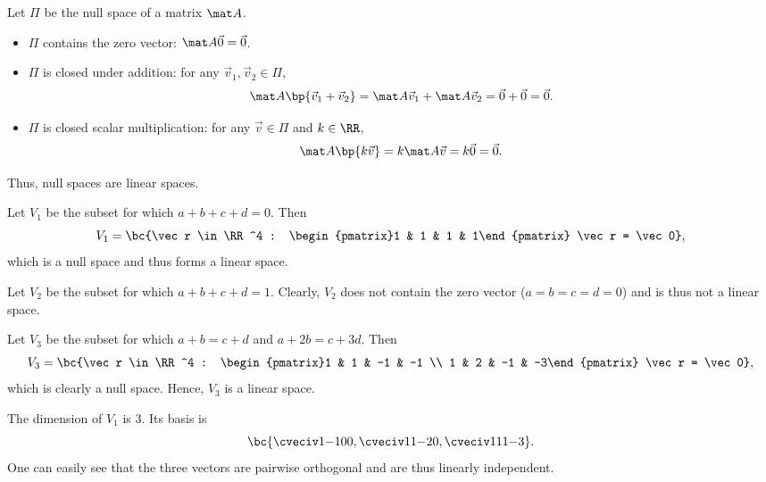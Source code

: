 \begin{solution}
    Let $\Pi$ be the null space of a matrix $\mat A$.
    \begin{itemize}
        \item $\Pi$ contains the zero vector: $\mat A \vec 0 = \vec 0$.
        \item $\Pi$ is closed under addition: for any $\vec v_1, \vec v_2 \in \Pi$, \[\mat A \bp{\vec v_1 + \vec v_2} = \mat A \vec v_1 + \mat A \vec v_2 = \vec 0 + \vec 0 = \vec 0.\]
        \item $\Pi$ is closed scalar multiplication: for any $\vec v \in \Pi$ and $k \in \RR$, \[\mat A \bp{k \vec v} = k \mat A \vec v = k \vec 0 = \vec 0.\]
    \end{itemize}
    Thus, null spaces are linear spaces.
        
    \begin{ppart}
        Let $V_1$ be the subset for which $a + b + c + d = 0$. Then \[V_1 = \bc{\vec r \in \RR^4 : \begin{pmatrix}1 & 1 & 1 & 1\end{pmatrix} \vec r = \vec 0},\] which is a null space and thus forms a linear space.
    \end{ppart}
    \begin{ppart}
        Let $V_2$ be the subset for which $a + b + c + d = 1$. Clearly, $V_2$ does not contain the zero vector ($a = b = c = d = 0$) and is thus not a linear space.
    \end{ppart}
    \begin{ppart}
        Let $V_3$ be the subset for which $a + b = c + d$ and $a + 2b = c + 3d$. Then \[V_3 = \bc{\vec r \in \RR^4 : \begin{pmatrix}1 & 1 & -1 & -1 \\ 1 & 2 & -1 & -3\end{pmatrix} \vec r = \vec 0},\] which is clearly a null space. Hence, $V_3$ is a linear space.
    \end{ppart}
    \begin{ppart}
        The dimension of $V_1$ is 3. Its basis is \[\bc{\cveciv1{-1}00, \cveciv11{-2}{0}, \cveciv111{-3}}.\] One can easily see that the three vectors are pairwise orthogonal and are thus linearly independent.
    \end{ppart}
\end{solution}

